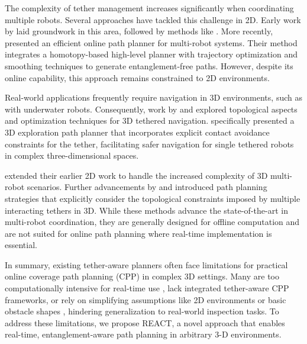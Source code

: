The complexity of tether management increases significantly when coordinating multiple robots. Several approaches have tackled this challenge in 2D. Early work by \cite{hert1996ties} laid groundwork in this area, followed by methods like \cite{zhang2019planning}. More recently, \cite{cao2023neptune} presented an efficient online path planner for multi-robot systems. Their method integrates a homotopy-based high-level planner with trajectory optimization and smoothing techniques to generate entanglement-free paths. However, despite its online capability, this approach remains constrained to 2D environments.

Real-world applications frequently require navigation in 3D environments, such as with underwater robots. Consequently, work by  \cite{bhattacharya2012topological} and \cite{martinez2021optimization} explored topological aspects and optimization techniques for 3D tethered navigation. \cite{petit2022tape} specifically presented a 3D exploration path planner that incorporates explicit contact avoidance constraints for the tether, facilitating safer navigation for single tethered robots in complex three-dimensional spaces.

 \cite{hert1999motion} extended their earlier 2D work to handle the increased complexity of 3D multi-robot scenarios. Further advancements by \cite{patil2023coordinating} and  \cite{cao2023path} introduced path planning strategies that explicitly consider the topological constraints imposed by multiple interacting tethers in 3D. While these methods advance the state-of-the-art in multi-robot coordination, they are generally designed for offline computation and are not suited for online path planning where real-time implementation is essential.

In summary, existing tether-aware planners often face limitations for practical online coverage path planning (CPP) in complex 3D settings. Many are too computationally intensive for real-time use \cite{mechsy2017novel, hert1999motion, patil2023coordinating, cao2023path}, lack integrated tether-aware CPP frameworks, or rely on simplifying assumptions like 2D environments or basic obstacle shapes \cite{kim, withy, cao2023neptune}, hindering generalization to real-world inspection tasks.
To address these limitations, we propose \ac{REACT}, a novel approach that enables real-time, entanglement-aware path planning in arbitrary 3-D environments.


